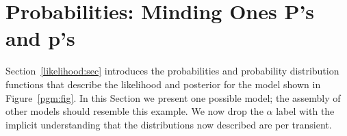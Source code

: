 \documentclass[preprint,3p]{elsarticle}
\begin{document}
%


\section{Probabilities: Minding Ones P's and p's}
Section~\ref{likelihood:sec} introduces the probabilities and probability distribution functions that describe the likelihood
and posterior for the model shown in Figure~\ref{pgm:fig}.
In this Section we present one possible model; the assembly of other models should
resemble this example.
We now drop the $\alpha$ label with the implicit understanding that the distributions
now described are per transient.
\end{document}
